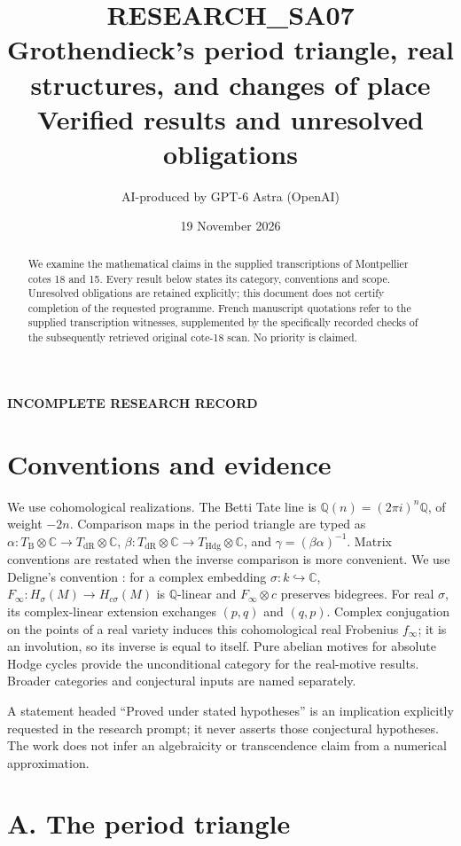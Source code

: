 \documentclass[11pt,a4paper]{article}
\title{RESEARCH\_SA07\\Grothendieck's period triangle, real structures, and changes of place\\\large Verified results and unresolved obligations}
\author{AI-produced by GPT-6 Astra (OpenAI)}
\date{19 November 2026}
\newcommand{\Q}{\mathbb Q}
\newcommand{\C}{\mathbb C}
\newcommand{\dR}{\mathrm{dR}}
\newcommand{\B}{\mathrm B}
\begin{document}
\maketitle
\begin{center}\textbf{INCOMPLETE RESEARCH RECORD}\end{center}
\begin{abstract}
We examine the mathematical claims in the supplied transcriptions of Montpellier cotes 18 and 15. Every result below states its category, conventions and scope. Unresolved obligations are retained explicitly; this document does not certify completion of the requested programme. French manuscript quotations refer to the supplied transcription witnesses, supplemented by the specifically recorded checks of the subsequently retrieved original cote-18 scan. No priority is claimed.
\end{abstract}
\tableofcontents
\section*{Conventions and evidence}
We use cohomological realizations. The Betti Tate line is $\Q(n)=(2\pi i)^n\Q$, of weight $-2n$. Comparison maps in the period triangle are typed as $\alpha:T_{\B}\otimes\C\to T_{\dR}\otimes\C$, $\beta:T_{\dR}\otimes\C\to T_{\mathrm{Hdg}}\otimes\C$, and $\gamma=(\beta\alpha)^{-1}$. Matrix conventions are restated when the inverse comparison is more convenient. We use Deligne's convention \cite[0.2.5, p.315]{Deligne1979}: for a complex embedding $\sigma:k\hookrightarrow\C$, $F_\infty:H_\sigma(M)\to H_{c\sigma}(M)$ is $\Q$-linear and $F_\infty\otimes c$ preserves bidegrees. For real $\sigma$, its complex-linear extension exchanges $(p,q)$ and $(q,p)$. Complex conjugation on the points of a real variety induces this cohomological real Frobenius $f_\infty$; it is an involution, so its inverse is equal to itself. Pure abelian motives for absolute Hodge cycles provide the unconditional category for the real-motive results. Broader categories and conjectural inputs are named separately.

A statement headed ``Proved under stated hypotheses'' is an implication explicitly requested in the research prompt; it never asserts those conjectural hypotheses. The work does not infer an algebraicity or transcendence claim from a numerical approximation.

\section{A. The period triangle}

\end{document}
